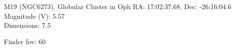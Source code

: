 \begin{block}{M19 (NGC6273), Globular Cluster in Oph}
    RA: 17:02:37.68, Dec: -26:16:04.6 \\ 
    Magnitude (V): 5.57 \\ 
    Dimensions: 7.5 

    Finder fov: 60 
\end{block}